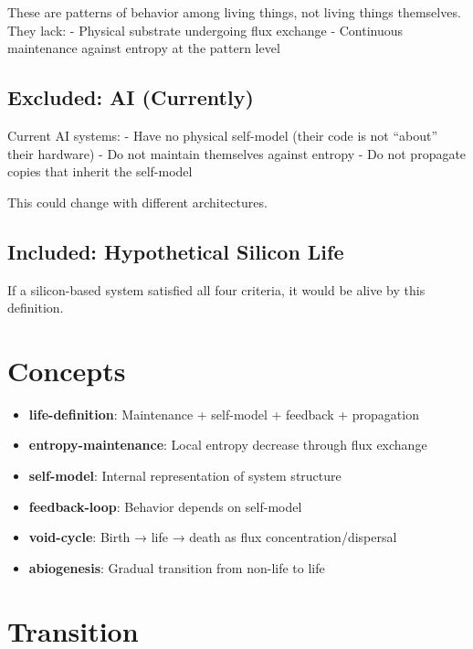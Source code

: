 \documentclass[
  11pt,
  letterpaper,
  twoside,
  openright]{book}
\providecommand{\tightlist}{%
  \setlength{\itemsep}{0pt}\setlength{\parskip}{0pt}}
\begin{document}
These are patterns of behavior among living things, not living things
themselves. They lack: - Physical substrate undergoing flux exchange -
Continuous maintenance against entropy at the pattern level

\subsection{Excluded: AI (Currently)}\label{excluded-ai-currently}

Current AI systems: - Have no physical self-model (their code is not
``about'' their hardware) - Do not maintain themselves against entropy -
Do not propagate copies that inherit the self-model

This could change with different architectures.

\subsection{Included: Hypothetical Silicon
Life}\label{included-hypothetical-silicon-life}

If a silicon-based system satisfied all four criteria, it would be alive
by this definition.

\section{Concepts}\label{concepts-36}

\begin{itemize}
\tightlist
\item
  \textbf{life-definition}: Maintenance + self-model + feedback +
  propagation
\item
  \textbf{entropy-maintenance}: Local entropy decrease through flux
  exchange
\item
  \textbf{self-model}: Internal representation of system structure
\item
  \textbf{feedback-loop}: Behavior depends on self-model
\item
  \textbf{void-cycle}: Birth → life → death as flux
  concentration/dispersal
\item
  \textbf{abiogenesis}: Gradual transition from non-life to life
\end{itemize}

\section{Transition}\label{transition-37}
\end{document}
